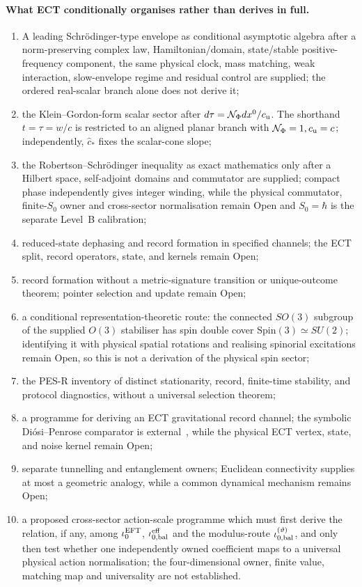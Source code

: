 \documentclass[11pt,a4paper]{article}
\begin{document}
\paragraph{What ECT conditionally organises rather than derives in full.}
\begin{enumerate}[label=(\roman*)]
\item A leading Schr\"odinger-type envelope as conditional asymptotic algebra after a norm-preserving complex law, Hamiltonian/domain, state/stable positive-frequency component, the same physical clock, mass matching, weak interaction, slow-envelope regime and residual control are supplied; the ordered real-scalar branch alone does not derive it;
\item the Klein--Gordon-form scalar sector after
      $d\tau=\mathcal N_\Phi dx^0/c_{\rm u}$.  The shorthand
      $t=\tau=w/c$ is restricted to an aligned planar branch with
      $\mathcal N_\Phi=1,c_{\rm u}=c$; independently, $\hat c_*$ fixes the
      scalar-cone slope;
\item the Robertson--Schr\"odinger inequality as exact mathematics only after a Hilbert space, self-adjoint domains and commutator are supplied; compact phase independently gives integer winding, while the physical commutator, finite-$S_0$ owner and cross-sector normalisation remain Open and $S_0=\hbar$ is the separate Level~B calibration;
\item reduced-state dephasing and record formation in specified channels; the ECT split, record operators, state, and kernels remain Open;
\item record formation without a metric-signature transition or unique-outcome theorem; pointer selection and update remain Open;
\item a conditional representation-theoretic route: the connected $SO(3)$
subgroup of the supplied $O(3)$ stabiliser has spin double cover
$\mathrm{Spin}(3)\simeq SU(2)$; identifying it with physical spatial
rotations and realising spinorial excitations remain Open, so this is not a
derivation of the physical spin sector;
\item the PES-R inventory of distinct stationarity, record, finite-time stability, and protocol diagnostics, without a universal selection theorem;
\item a programme for deriving an ECT gravitational record channel; the symbolic Di\'osi--Penrose comparator is external~\cite{Diosi1987,Penrose1996}, while the physical ECT vertex, state, and noise kernel remain Open;
\item separate tunnelling and entanglement owners; Euclidean connectivity supplies at most a geometric analogy, while a common dynamical mechanism remains Open;
\item a proposed cross-sector action-scale programme which must first derive the relation, if any, among $\iota_0^{\rm EFT}$, $\iota_{0,\rm bal}^{\rm eff}$ and the modulus-route $\iota_{0,\rm bal}^{(\vartheta)}$, and only then test whether one independently owned coefficient maps to a universal physical action normalisation; the four-dimensional owner, finite value, matching map and universality are not established.
\end{enumerate}
\end{document}
